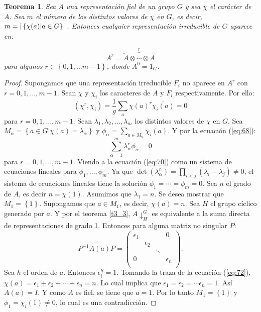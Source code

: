 \documentclass[12pt]{book}
\newtheorem{theorem}{Teorema}[section]
\theoremstyle{definition}
\newcounter{in}
\begin{document}
\begin{theorem}
  \label{t6_3}
  Sea $A$ una representación fiel de un grupo $G$ y sea $\chi$ el
  carácter de $A$. Sea $m$ el número de los distintos valores de
  $\chi$ en $G$, es
  decir,~$m = |\left\{ \chi(a) \arrowvert a \in G \right\}
  |$. Entonces cualquier representación irreducible de $G$ aparece en:

  \begin{equation*}
    A^{r}=  \overbrace{A \otimes \cdots \otimes A}^{r}
  \end{equation*}
  para algunos $r \in \left\{ 0, 1, \ldots m-1 \right\}$, donde $A^{0}=1_{G}$.
\end{theorem}
\begin{proof}
  Supongamos que una representación irreducible $F_{i}$ no aparece en
  $A^{r}$ con $r=0,1,\ldots,m-1$. Sean $\chi$ y $\chi_{i}$ los
  caracteres de $A$ y $F_{i}$ respectivamente. Por ello:
  \begin{equation}
    \label{eq:68}
    (\chi^{r},\chi_{i}) = \frac{1}{g} \sum_{a} \chi(a)^{r} \overline{\chi_{i}(a)}=0
  \end{equation}
  para $r=0,1, \ldots, m-1$. Sean
  $\lambda_{1}, \lambda_{2}, \ldots, \lambda_{m}$ los distintos valores
  de $\chi$ en $G$. Sea
  $M_{\alpha}=\left\{ a \in G | \chi(a)=\lambda_{\alpha} \right\}$ y
  $\phi_{\alpha}= \sum_{a \in M_{\alpha}} \overline{\chi_{i}(a)}$. Y por la ecuación (\ref{eq:68}):
  \begin{equation}
    \label{eq:70}
    \sum_{\alpha=1}^{m} \lambda_{\alpha}^{r} \phi_{\alpha} =0
  \end{equation}
  para $r=0,1, \ldots,m-1$. Viendo a la ecuación (\ref{eq:70}) como un sistema de
  ecuaciones lineales para $\phi_{1}, \ldots, \phi_{m}$. Ya que
  $\det (\lambda_{\alpha}^{r}) = \prod_{i<j} (\lambda_{i}-\lambda_{j})
  \neq 0$, el sistema de ecuaciones lineales tiene la solución
  $\phi_{1}= \cdots= \phi_{m}=0$.  Sea $n$ el grado de $A$, es decir
  $n=\chi(1)$. Asumimos que $\lambda_{1}=n$. Se desea mostrar que
  $M_{1}=\left\{ 1 \right\}$. Supongamos que $a \in M_{1}$, es decir,
  $\chi(a)=n$. Sea $H$ el grupo cíclico generado por $a$. Y por el
  teorema \ref{t3_3}, $A\downarrow^{G}_{H}$ es equivalente a la suma directa de
  representaciones de grado 1. Entonces para alguna matriz no singular
  $P$:
  \begin{equation}
    \label{eq:72}
    P^{-1}A(a)P=
    \begin{pmatrix}
      \epsilon_{1} & & & 0 \\ 
      & \epsilon_{2} & & \\
      & & \ddots & \\
      0 & & & \epsilon_{n}\\
    \end{pmatrix}
    .
  \end{equation}
  Sea $h$ el orden de $a$. Entonces $\epsilon_{i}^{h}=1$. Tomando la
  traza de la ecuación (\ref{eq:72}),
  $\chi(a) = \epsilon_{1} + \epsilon_{2} + \cdots +
  \epsilon_{n}=n$. Lo cual implica que
  $\epsilon_{1}=\epsilon_{2}= \cdots \epsilon_{n}=1$. Así $A(a)=I$. Y
  como $A$ es fiel, se tiene que $a=1$. Por lo tanto
  $M_{1}=\left\{ 1 \right\}$ y $\phi_{1}= \chi_{i}(1) \neq 0$, lo cual
  es una contradicción.
\end{proof}
\end{document}
